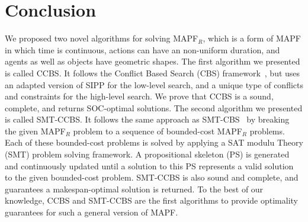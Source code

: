 \documentclass[review]{elsarticle}
\newcommand{\smt}{\ac{SMT}\xspace}
\newcommand{\ccbs}{\ac{CCBS}\xspace}
\newcommand{\cbs}{\ac{CBS}\xspace}
\newcommand{\sipp}{\ac{SIPP}\xspace}
\newcommand{\ps}{\ac{PS}\xspace}
\newcommand{\mapfr}{\ac{MAPF}$_R$\xspace}
\newcommand{\smtcbsO}{SMT-CBS\xspace} %
\newcommand{\smtccbs}{SMT-CCBS\xspace}
\newcommand{\mapf}{\ac{MAPF}\xspace}
\begin{document}




\section{Conclusion}
\label{sec:conclusion}

We proposed two novel algorithms for solving \mapfr, which is a form of \mapf in which time is continuous, actions can have an non-uniform duration, and agents as well as objects have geometric shapes. 
The first algorithm we presented is called \ccbs. It follows the Conflict Based Search (\cbs) framework~\cite{sharon2015conflict}, but uses an adapted version of \sipp for the low-level search, and a unique type of conflicts and constraints for the high-level search. 
We prove that \ccbs is a sound, complete, and returns SOC-optimal solutions. 
The second algorithm we presented is called \smtccbs. 
It follows the same approach as \smtcbsO~\cite{DBLP:conf/ijcai/Surynek19} by breaking the given \mapfr problem to a sequence of bounded-cost \mapfr problems. Each of these bounded-cost problems is solved by 
applying a SAT modulu Theory (\smt) problem solving framework. 
A propositional skeleton (\ps) is generated and continuously updated until a solution to this \ps represents a valid solution to the given bounded-cost problem. 
\smtccbs is also sound and complete, and guarantees a makespan-optimal solution is returned. 
To the best of our knowledge, \ccbs and \smtccbs are the first algorithms to provide optimality guarantees for such a general version of \mapf. 
\end{document}
